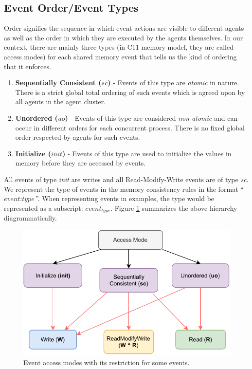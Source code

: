     \subsection{Event Order/Event Types} 
        Order signifies the sequence in which event actions are visible to different agents as well as the order in which they are executed by the agents themselves. 
        In our context, there are mainly three types (in C11 memory model, they are called access modes\cite{C11MM}) for each shared memory event that tells us the kind of ordering that it enforces. 
        \begin{enumerate}
            \item \textbf{Sequentially Consistent ($sc$)} - Events of this type are \textit{atomic} in nature\footnotemark. There is a strict global total ordering of such events which is agreed upon by all agents in the agent cluster. 
            
            \item \textbf{Unordered ($uo$)} - Events of this type are considered \textit{non-atomic} and can occur in different orders for each concurrent process. There is no fixed global order respected by agents for such events. 
            
            \item \textbf{Initialize ($init$)} - Events of this type are used to initialize the values in memory before they are accessed by events. 
        \end{enumerate}

        All events of type \textit{init} are writes and all Read-Modify-Write events are of type \textit{sc}.  
        We represent the type of events in the memory consistency rules in the format ``$\textit{event} : \textit{type}$''. 
        When representing events in examples, the type would be represented as a subscript: $\textit{event}_\textit{type}$. 
        Figure \ref{model:event_types} summarizes the above hierarchy diagrammatically.
        \begin{figure}[H]
            \centering
            \includegraphics[scale=0.7]{3.ECMAScriptMemoryModel/AccessModes.pdf}
            \caption{Event access modes with its restriction for some events.}
            \label{model:event_types}
        \end{figure}

